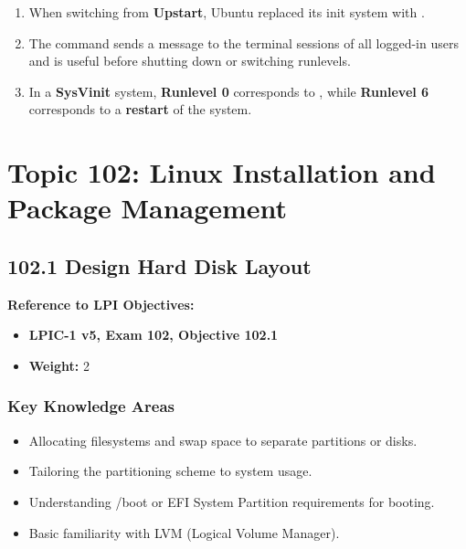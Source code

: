 \documentclass[12pt,a4paper]{report}
\begin{document}
\begin{enumerate}[1.]
\item When switching from \textbf{Upstart}, Ubuntu replaced its init system with \textbf{\underline{\hspace{2cm}}}.

\item The \textbf{\underline{\hspace{2cm}}} command sends a message to the terminal sessions of all logged-in users and is useful before shutting down or switching runlevels.

\item In a \textbf{SysVinit} system, \textbf{Runlevel 0} corresponds to \textbf{\underline{\hspace{2cm}}}, while \textbf{Runlevel 6} corresponds to a \textbf{restart} of the system.

\end{enumerate}

\chapter{Topic 102: Linux Installation and Package Management}

\newpage

\section*{102.1 Design Hard Disk Layout}

\textbf{Reference to LPI Objectives:}  
\begin{itemize}
    \item \textbf{LPIC-1 v5, Exam 102, Objective 102.1}  
    \item \textbf{Weight:} 2  
\end{itemize}

\subsection*{Key Knowledge Areas}
\begin{itemize}
    \item Allocating filesystems and swap space to separate partitions or disks.  
    \item Tailoring the partitioning scheme to system usage.  
    \item Understanding /boot or EFI System Partition requirements for booting.  
    \item Basic familiarity with LVM (Logical Volume Manager).
\end{itemize}
\end{document}

